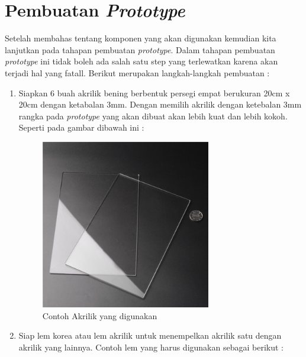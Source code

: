 \section{Pembuatan \textit{Prototype}}
Setelah membahas tentang komponen yang akan digunakan kemudian kita lanjutkan pada tahapan pembuatan \textit{prototype}. Dalam tahapan pembuatan \textit{prototype} ini tidak boleh ada salah satu step yang terlewatkan karena akan terjadi hal yang fatall. Berikut merupakan langkah-langkah pembuatan :
\begin{enumerate}
    \item Siapkan 6 buah akrilik bening berbentuk persegi empat berukuran 20cm x 20cm dengan ketabalan 3mm. Dengan memilih akrilik dengan ketebalan 3mm rangka pada \textit{prototype} yang akan dibuat akan lebih kuat dan lebih kokoh. Seperti pada gambar dibawah ini :
\begin{figure}[H]
\centering
\includegraphics[width=0.7\textwidth]{figures/akrilik.jpg}
\caption{Contoh Akrilik yang digunakan}
\label{print}
\end{figure}

\item Siap lem korea atau lem akrilik untuk menempelkan akrilik satu dengan akrilik yang lainnya. Contoh lem yang harus digunakan sebagai berikut :


\end{enumerate}
